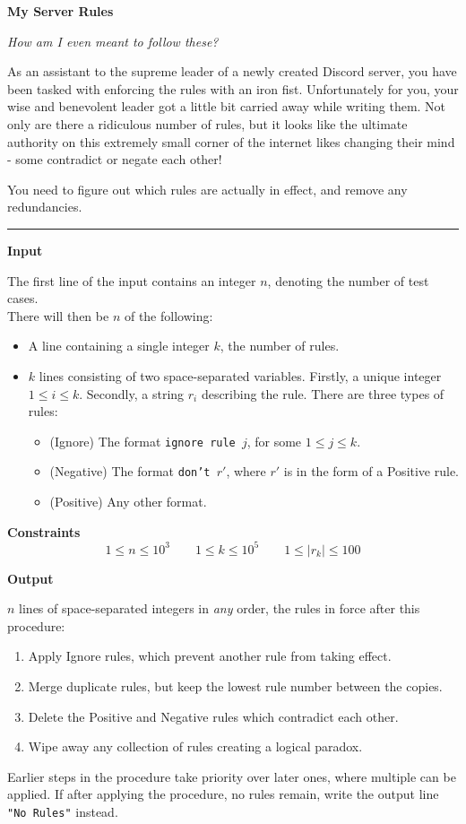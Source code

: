 \LARGE {} \textbf{My Server Rules} \normalsize

{\itshape How am I even meant to follow these?}

As an assistant to the supreme leader of a newly created Discord server, you have been tasked with enforcing the rules with an iron fist.
Unfortunately for you, your wise and benevolent leader got a little bit carried away while writing them. 
Not only are there a ridiculous number of rules, but it looks like the ultimate authority on this extremely small corner of the internet likes changing their mind - some contradict or negate each other!

You need to figure out which rules are actually in effect, and remove any redundancies.

\vspace{8pt}
\hrule

\textbf{Input}

The first line of the input contains an integer $n$, denoting the number of test cases. \\
There will then be $n$ of the following:
\begin{itemize}
    \item A line containing a single integer $k$, the number of rules.
    \item $k$ lines consisting of two space-separated variables. 
    Firstly, a unique integer $1 \leq i \leq k$.
    Secondly, a string $r_i$ describing the rule. There are three types of rules:
    \begin{itemize}
        \item (Ignore) The format \texttt{ignore rule }$j$, for some $1 \leq j \leq k$.
        \item (Negative) The format \texttt{don't }$r'$, where $r'$ is in the form of a Positive rule.
        \item (Positive) Any other format.
    \end{itemize}
\end{itemize}

\textbf{Constraints}
\begin{equation*}
    1 \leq n \leq 10^3 \qquad 
    1 \leq k \leq 10^5 \qquad 
    1 \leq |r_k| \leq 100
\end{equation*}

\textbf{Output}

$n$ lines of space-separated integers in \textit{any} order, the rules in force after this procedure:
\begin{enumerate}
    \item Apply Ignore rules, which prevent another rule from taking effect.
    \item Merge duplicate rules, but keep the lowest rule number between the copies.
    \item Delete the Positive and Negative rules which contradict each other.
    \item Wipe away any collection of rules creating a logical paradox.
\end{enumerate}
Earlier steps in the procedure take priority over later ones, where multiple can be applied.
If after applying the procedure, no rules remain, write the output line \texttt{"No Rules"} instead.

